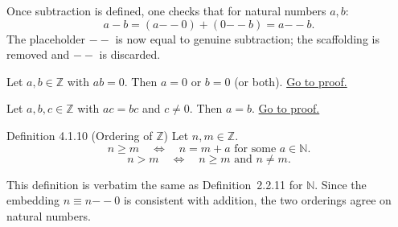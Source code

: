 \begin{remark*}
Once subtraction is defined, one checks that for natural numbers
$a, b$:
\[
a - b = (a {-\!\!-} 0) + (0 {-\!\!-} b) = a {-\!\!-} b.
\]
The placeholder $--$ is now equal to genuine subtraction; the
scaffolding is removed and $--$ is discarded.
\end{remark*}

\begin{proposition}
\label{prop:int-no-zero-div}
Let $a, b \in \mathbb{Z}$ with $ab = 0$. Then $a = 0$ or $b = 0$ (or both).
\hyperref[prf:int-no-zero-div]{Go to proof.}
\end{proposition}

\begin{corollary}
\label{cor:int-cancel}
Let $a, b, c \in \mathbb{Z}$ with $ac = bc$ and $c \neq 0$. Then $a = b$.
\hyperref[prf:int-cancel]{Go to proof.}
\end{corollary}

\begin{propositionbox}{Definition 4.1.10 (Ordering of $\mathbb{Z}$)}
Let $n, m \in \mathbb{Z}$.
\[
n \geq m \quad\iff\quad n = m + a \text{ for some } a \in \mathbb{N}.
\]
\[
n > m \quad\iff\quad n \geq m \text{ and } n \neq m.
\]
\end{propositionbox}

\begin{remark*}
This definition is verbatim the same as Definition~2.2.11 for $\mathbb{N}$.
Since the embedding $n \equiv n {-\!\!-} 0$ is consistent with addition,
the two orderings agree on natural numbers.
\end{remark*}

